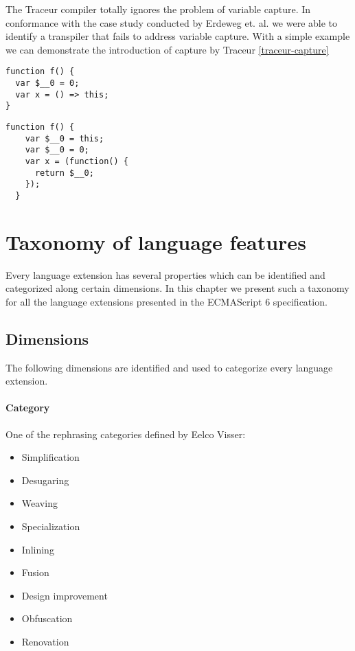 The Traceur compiler totally ignores the problem of variable capture. In conformance with the case study conducted by Erdeweg et. al. \cite{Erdweg2014} we were able to identify a transpiler that fails to address variable capture. With a simple example we can demonstrate the introduction of capture by Traceur \ref{traceur-capture}

\begin{lstlisting}[label=traceur-capture, caption=Example input to Traceur\protect\footnotemark]
function f() {
  var $__0 = 0;
  var x = () => this; 
}
\end{lstlisting}

\begin{lstlisting}[caption=Variable capture]
function f() {
    var $__0 = this;
    var $__0 = 0;
    var x = (function() {
      return $__0;
    });
  }
\end{lstlisting}

\section{Taxonomy of language features}

Every language extension has several properties which can be identified and categorized along certain dimensions. In this chapter we present such a taxonomy for all the language extensions presented in the ECMAScript 6 specification\cite{SpecJS}.

\subsection{Dimensions}
The following dimensions are identified and used to categorize every language extension.

\paragraph{Category}
One of the rephrasing categories defined by Eelco Visser\cite{Visser2001}:
\\ 
\begin{itemize}
	\item Simplification
	\item Desugaring
	\item Weaving
	\item Specialization
	\item Inlining
	\item Fusion
	\item Design improvement
	\item Obfuscation
	\item Renovation
\end{itemize}


